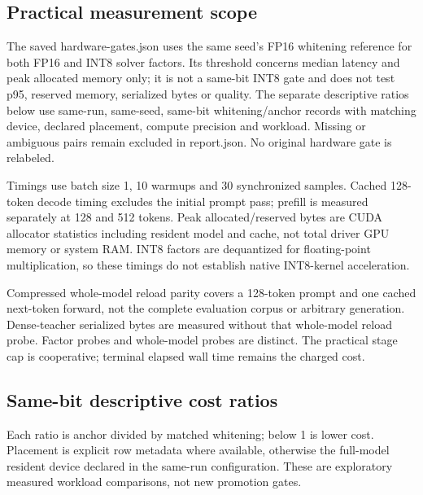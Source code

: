 \documentclass[10pt]{article}
\begin{document}
\subsection{Practical measurement scope}

The saved hardware-gates.json uses the same seed's FP16 whitening reference for both FP16 and INT8 solver factors. Its threshold concerns median latency and peak allocated memory only; it is not a same-bit INT8 gate and does not test p95, reserved memory, serialized bytes or quality. The separate descriptive ratios below use same-run, same-seed, same-bit whitening/anchor records with matching device, declared placement, compute precision and workload. Missing or ambiguous pairs remain excluded in report.json. No original hardware gate is relabeled.

Timings use batch size 1, 10 warmups and 30 synchronized samples. Cached 128-token decode timing excludes the initial prompt pass; prefill is measured separately at 128 and 512 tokens. Peak allocated/reserved bytes are CUDA allocator statistics including resident model and cache, not total driver GPU memory or system RAM. INT8 factors are dequantized for floating-point multiplication, so these timings do not establish native INT8-kernel acceleration.

Compressed whole-model reload parity covers a 128-token prompt and one cached next-token forward, not the complete evaluation corpus or arbitrary generation. Dense-teacher serialized bytes are measured without that whole-model reload probe. Factor probes and whole-model probes are distinct. The practical stage cap is cooperative; terminal elapsed wall time remains the charged cost.

\subsection{Same-bit descriptive cost ratios}

Each ratio is anchor divided by matched whitening; below 1 is lower cost. Placement is explicit row metadata where available, otherwise the full-model resident device declared in the same-run configuration. These are exploratory measured workload comparisons, not new promotion gates.
\end{document}
